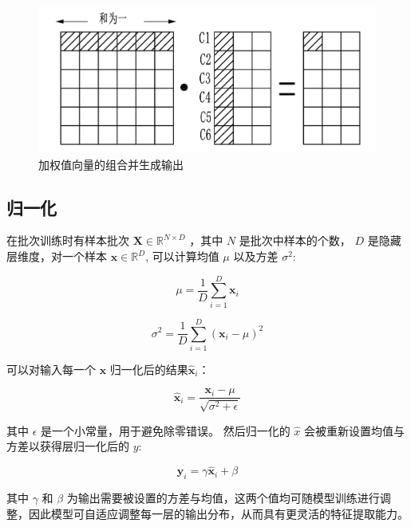 \begin{figure}
    \centering
    \includegraphics[width=0.8\linewidth]{img/multimodal/attention_fin.pdf}
    \caption{加权值向量的组合并生成输出 }
    \label{fig:attention_fin}
\end{figure}

\subsection{归一化}

在批次训练时有样本批次 $\mathbf{X} \in \mathbb{R}^{N \times D}$ ，其中 $N$ 是批次中样本的个数， $D$ 是隐藏层维度，对一个样本 $\mathbf{x} \in \mathbb{R}^D$, 可以计算均值 $\mu$ 以及方差 $\sigma^2$:

\begin{equation}
\mu = \frac{1}{D} \sum_{i=1}^{D} \mathbf{x}_i
\end{equation}

\begin{equation}
\sigma^2 = \frac{1}{D} \sum_{i=1}^{D} (\mathbf{x}_i - \mu)^2
\end{equation}


可以对输入每一个 $\mathbf{x}$ 归一化后的结果$\hat{\mathbf{x}}_i$：

\begin{equation}
\hat{\mathbf{x}}_i = \frac{\mathbf{x}_i - \mu}{\sqrt{\sigma^2 + \epsilon}}
\end{equation}

其中 $\epsilon$ 是一个小常量，用于避免除零错误。 然后归一化的 $\hat{x}$ 会被重新设置均值与方差以获得层归一化后的 $y$:

\begin{equation}
\mathbf{y}_i = \gamma \hat{\mathbf{x}}_i + \beta
\end{equation}

其中 $\gamma$ 和 $\beta$ 为输出需要被设置的方差与均值，这两个值均可随模型训练进行调整，因此模型可自适应调整每一层的输出分布，从而具有更灵活的特征提取能力。

